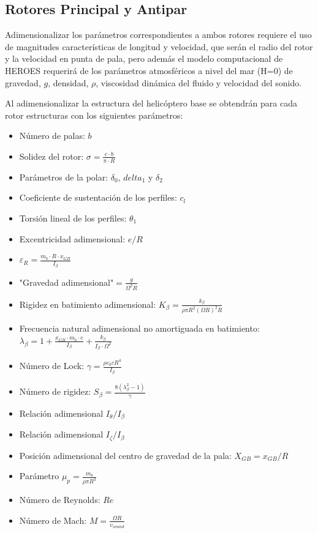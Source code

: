 \subsection{Rotores Principal y Antipar}

Adimensionalizar los parámetros correspondientes a ambos rotores requiere el uso de magnitudes características de longitud y velocidad, que serán el radio del rotor y la velocidad en punta de pala, pero además el modelo computacional de HEROES requerirá de los parámetros atmosféricos a nivel del mar (H=0) de gravedad, $g$, densidad, $\rho$, viscosidad dinámica del fluido y velocidad del sonido.

Al adimensionalizar la estructura del helicóptero base se obtendrán para cada rotor estructuras con los siguientes parámetros:

\begin{multicols}{2}
	\begin{itemize}
		\item Número de palas: $b$
		\item Solidez del rotor: $\sigma=\frac{c\cdot b}{\pi\cdot R}$
		\item Parámetros de la polar: $\delta_0$, $delta_1$ y $\delta_2$
		\item Coeficiente de sustentación de los perfiles: $c_l$
		\item Torsión lineal de los perfiles: $\theta_1$
		\item Excentricidad adimensional: $e/R$
		\item $\varepsilon_R=\frac{m_b\cdot R\cdot x_{GB}}{I_\beta}$
		\item "Gravedad adimensional"$=\frac{g}{\Omega^2R}$
		\item Rigidez en batimiento adimensional: $K_\beta=\frac{k_\beta}{\rho \pi R^2(\Omega R)^2R}$
		\item Frecuencia natural adimensional no amortiguada en batimiento: $\lambda_\beta=1+\frac{x_{GB}\cdot m_b\cdot e}{I_\beta}+\frac{k_\beta}{I_\beta\cdot\Omega^2}$
		\item Número de Lock: $\gamma=\frac{\rho c_0cR^4}{I_\beta}$
		\item Número de rigidez: $S_\beta=\frac{8(\lambda_\beta^2-1)}{\gamma}$
		\item Relación adimensional $I_\theta/I_\beta$
		\item Relación adimensional $I_\zeta/I_\beta$
		\item Posición adimensional del centro de gravedad de la pala: $X_{GB}=x_{GB}/R$
		\item Parámetro $\mu_p=\frac{m_b}{\rho\pi R^3}$
		\item Número de Reynolds: $Re$
		\item Número de Mach: $M=\frac{\Omega R}{v_{sound}}$
		\end{itemize}
\end{multicols}

